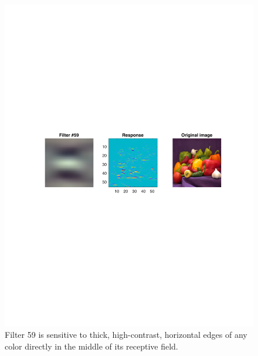 \documentclass[]{article}
\begin{document}
\begin{figure}[H]
    \centering
    \includegraphics[width=0.7\linewidth]{problem2Bfilter59.pdf}
    \caption{Filter 59 is sensitive to thick, high-contrast, horizontal edges of any color directly in the middle of its receptive field. }
    \label{fig:my_label}
\end{figure}
\end{document}
